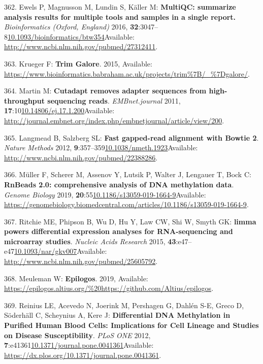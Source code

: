 \documentclass[
]{book}
\begin{document}
\leavevmode\hypertarget{ref-Ewels2016}{}%
362. Ewels P, Magnusson M, Lundin S, Käller M: \textbf{MultiQC: summarize analysis results for multiple tools and samples in a single report.} \emph{Bioinformatics (Oxford, England)} 2016, \textbf{32}:3047--8\href{https://doi.org/10.1093/bioinformatics/btw354}{10.1093/bioinformatics/btw354}Available: \url{http://www.ncbi.nlm.nih.gov/pubmed/27312411}.

\leavevmode\hypertarget{ref-Krueger2015}{}%
363. Krueger F: \textbf{Trim Galore}. 2015, Available: \url{https://www.bioinformatics.babraham.ac.uk/projects/trim\%7B/_\%7Dgalore/}.

\leavevmode\hypertarget{ref-Martin2011}{}%
364. Martin M: \textbf{Cutadapt removes adapter sequences from high-throughput sequencing reads}. \emph{EMBnet.journal} 2011, \textbf{17}:10\href{https://doi.org/10.14806/ej.17.1.200}{10.14806/ej.17.1.200}Available: \url{http://journal.embnet.org/index.php/embnetjournal/article/view/200}.

\leavevmode\hypertarget{ref-Langmead2012}{}%
365. Langmead B, Salzberg SL: \textbf{Fast gapped-read alignment with Bowtie 2}. \emph{Nature Methods} 2012, \textbf{9}:357--359\href{https://doi.org/10.1038/nmeth.1923}{10.1038/nmeth.1923}Available: \url{http://www.ncbi.nlm.nih.gov/pubmed/22388286}.

\leavevmode\hypertarget{ref-Muller2019}{}%
366. Müller F, Scherer M, Assenov Y, Lutsik P, Walter J, Lengauer T, Bock C: \textbf{RnBeads 2.0: comprehensive analysis of DNA methylation data}. \emph{Genome Biology} 2019, \textbf{20}:55\href{https://doi.org/10.1186/s13059-019-1664-9}{10.1186/s13059-019-1664-9}Available: \url{https://genomebiology.biomedcentral.com/articles/10.1186/s13059-019-1664-9}.

\leavevmode\hypertarget{ref-Ritchie2015}{}%
367. Ritchie ME, Phipson B, Wu D, Hu Y, Law CW, Shi W, Smyth GK: \textbf{limma powers differential expression analyses for RNA-sequencing and microarray studies}. \emph{Nucleic Acids Research} 2015, \textbf{43}:e47--e47\href{https://doi.org/10.1093/nar/gkv007}{10.1093/nar/gkv007}Available: \url{http://www.ncbi.nlm.nih.gov/pubmed/25605792}.

\leavevmode\hypertarget{ref-Meuleman2019}{}%
368. Meuleman W: \textbf{Epilogos}. 2019, Available: \url{https://epilogos.altius.org/\%20https://github.com/Altius/epilogos}.

\leavevmode\hypertarget{ref-Reinius2012}{}%
369. Reinius LE, Acevedo N, Joerink M, Pershagen G, Dahlén S-E, Greco D, Söderhäll C, Scheynius A, Kere J: \textbf{Differential DNA Methylation in Purified Human Blood Cells: Implications for Cell Lineage and Studies on Disease Susceptibility}. \emph{PLoS ONE} 2012, \textbf{7}:e41361\href{https://doi.org/10.1371/journal.pone.0041361}{10.1371/journal.pone.0041361}Available: \url{https://dx.plos.org/10.1371/journal.pone.0041361}.
\end{document}
